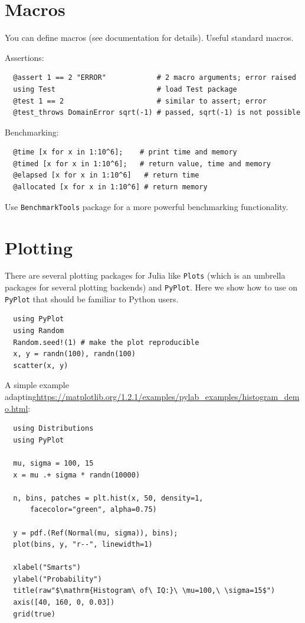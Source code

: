 \documentclass[10pt,a4paper]{article}
\begin{document}
\section{Macros}
You can define macros (see documentation for details). Useful standard macros.

Assertions:
\begin{lstlisting}
  @assert 1 == 2 "ERROR"            # 2 macro arguments; error raised
  using Test                        # load Test package
  @test 1 == 2                      # similar to assert; error
  @test_throws DomainError sqrt(-1) # passed, sqrt(-1) is not possible
\end{lstlisting}

Benchmarking:
\begin{lstlisting}
  @time [x for x in 1:10^6];    # print time and memory
  @timed [x for x in 1:10^6];   # return value, time and memory
  @elapsed [x for x in 1:10^6]   # return time
  @allocated [x for x in 1:10^6] # return memory
\end{lstlisting}
Use \lstinline|BenchmarkTools| package for a more powerful benchmarking functionality.

\section{Plotting}
There are several plotting packages for Julia like \lstinline|Plots| (which is
an umbrella packages for several plotting backends) and \lstinline|PyPlot|. Here
we show how to use on \lstinline|PyPlot| that should be familiar to Python
users.
\begin{lstlisting}
  using PyPlot
  using Random
  Random.seed!(1) # make the plot reproducible
  x, y = randn(100), randn(100)
  scatter(x, y)
\end{lstlisting}

A simple example adapting\newline\url{https://matplotlib.org/1.2.1/examples/pylab_examples/histogram_demo.html}:
\begin{lstlisting}
  using Distributions
  using PyPlot

  mu, sigma = 100, 15
  x = mu .+ sigma * randn(10000)

  n, bins, patches = plt.hist(x, 50, density=1,
      facecolor="green", alpha=0.75)

  y = pdf.(Ref(Normal(mu, sigma)), bins);
  plot(bins, y, "r--", linewidth=1)

  xlabel("Smarts")
  ylabel("Probability")
  title(raw"$\mathrm{Histogram\ of\ IQ:}\ \mu=100,\ \sigma=15$")
  axis([40, 160, 0, 0.03])
  grid(true)
\end{lstlisting}
\end{document}
